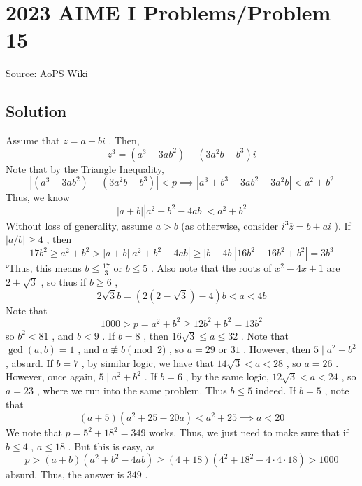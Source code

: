 \documentclass[12pt]{article}
\begin{document}
\section*{{2023 AIME I Problems/Problem 15}}
Source: AoPS Wiki

\subsection*{Solution}
Assume that $z=a+bi$ . Then, \[z^3=(a^3-3ab^2)+(3a^2b-b^3)i\] Note that by the Triangle Inequality, \[|(a^3-3ab^2)-(3a^2b-b^3)|<p\implies |a^3+b^3-3ab^2-3a^2b|<a^2+b^2\] Thus, we know \[|a+b||a^2+b^2-4ab|<a^2+b^2\] Without loss of generality, assume $a>b$ (as otherwise, consider $i^3\overline z=b+ai$ ). If $|a/b|\geq 4$ , then \[17b^2\geq a^2+b^2>|a+b||a^2+b^2-4ab|\geq |b-4b||16b^2-16b^2+b^2|=3b^3\] `Thus, this means $b\leq\frac{17}3$ or $b\leq 5$ . Also note that the roots of $x^2-4x+1$ are $2\pm\sqrt 3$ , so thus if $b\geq 6$ , \[2\sqrt 3b=(2(2-\sqrt 3)-4)b<a<4b\] Note that \[1000>p=a^2+b^2\geq 12b^2+b^2=13b^2\] so $b^2<81$ , and $b<9$ . If $b=8$ , then $16\sqrt 3\leq a\leq 32$ . Note that $\gcd(a,b)=1$ , and $a\not\equiv b\pmod 2$ , so $a=29$ or $31$ . However, then $5\mid a^2+b^2$ , absurd. If $b=7$ , by similar logic, we have that $14\sqrt 3 <a< 28$ , so $a=26$ . However, once again, $5\mid a^2+b^2$ . If $b=6$ , by the same logic, $12\sqrt3<a<24$ , so $a=23$ , where we run into the same problem. Thus $b\leq 5$ indeed. If $b=5$ , note that \[(a+5)(a^2+25-20a)<a^2+25\implies a<20\] We note that $p=5^2+18^2=349$ works. Thus, we just need to make sure that if $b\leq 4$ , $a\leq 18$ . But this is easy, as \[p>(a+b)(a^2+b^2-4ab)\geq (4+18)(4^2+18^2-4\cdot 4\cdot 18)>1000\] absurd. Thus, the answer is $\boxed{349}$ .
\end{document}
